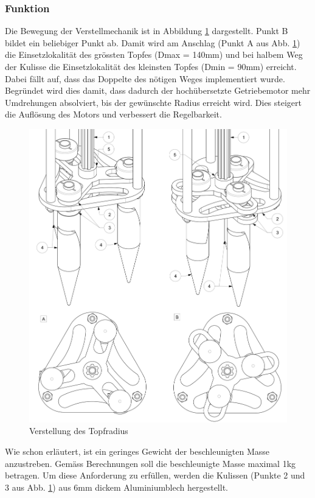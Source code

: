 \subsubsection{Funktion}
Die Bewegung der Verstellmechanik ist in Abbildung \ref{fig:motion_vm} dargestellt. Punkt B bildet ein beliebiger Punkt ab. Damit wird am Anschlag (Punkt A aus Abb. \ref{fig:motion_vm}) die Einsetzlokalität des grössten Topfes (Dmax = 140mm) und bei halbem Weg der Kulisse die Einsetzlokalität des kleinsten Topfes (Dmin = 90mm) erreicht. Dabei fällt auf, dass das Doppelte des nötigen Weges implementiert wurde. Begründet wird dies damit, dass dadurch der hochübersetzte Getriebemotor mehr Umdrehungen absolviert, bis der gewünschte Radius erreicht wird. Dies steigert die Auflösung des Motors und verbessert die Regelbarkeit.
	\begin{figure}[H]
	\includegraphics[scale=0.53]{Illustrationen/6-Umsetzung/motion_vm.jpg}
	\caption{Verstellung des Topfradius}
	\label{fig:motion_vm}
	\end{figure}

Wie schon erläutert, ist ein geringes Gewicht der beschleunigten Masse anzustreben. Gemäss Berechnungen soll die beschleunigte Masse maximal 1kg betragen. Um diese Anforderung zu erfüllen, werden die Kulissen (Punkte 2 und 3 aus Abb. \ref{fig:motion_vm}) aus 6mm dickem Aluminiumblech hergestellt.

